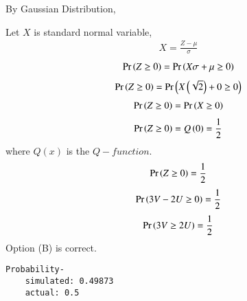\documentclass[journal,12pt,twocolumn]{IEEEtran}
\begin{document}
By Gaussian Distribution,

Let $X$ is standard normal variable,
\begin{align}
    X=\frac{Z-\mu}{\sigma}
\end{align}
\begin{align}
    \Pr\left(Z\geq0\right)=\Pr\left(X\sigma+\mu\geq0\right)
\end{align}
\begin{align}
    \Pr\left(Z\geq0\right)=\Pr\left(X\left(\sqrt{2}\right)+0\geq0\right)
\end{align}
\begin{align}
    \Pr\left(Z\geq0\right)=\Pr\left(X\geq0\right)
\end{align}
\begin{align}
    \Pr\left(Z\geq0\right)=Q\left(0\right)=\frac{1}{2}
\end{align}
where $Q(x)$ is the $Q-function$.
\begin{align}
    \Pr\left(Z\geq0\right)=\frac{1}{2}
\end{align}
\begin{align}
    \Pr\left(3V-2U\geq0\right)=\frac{1}{2}
\end{align}
\begin{align}
    \Pr\left(3V\geq2U\right)=\frac{1}{2}
\end{align}
Option (B) is correct.
\begin{lstlisting}
Probability-
    simulated: 0.49873
    actual: 0.5
\end{lstlisting}
\end{document}
